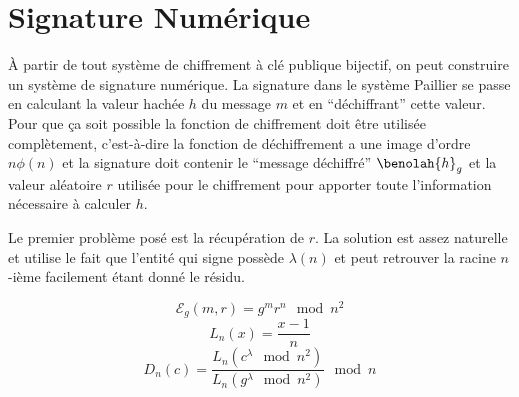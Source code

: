 \chapter{Signature Numérique}

	À partir de tout système de chiffrement à clé publique bijectif, on peut construire un système de signature 
	numérique. %
	La signature dans le sys\-tè\-me Paillier se passe en calculant la valeur hachée $h$ 
	du message $m$ et en ``dé\-chif\-frant'' cette valeur. Pour que ça soit possible 
	la fonction de chiffrement doit être utilisée complètement, c'est-à-dire la fonction de dé\-chif\-fre\-ment
	a une image d'ordre $n\phi(n)$ et la signature doit contenir le ``message déchiffré'' $\benolah{h}_g$ et la valeur 
	aléatoire $r$ utilisée pour le chiffrement pour apporter toute l'information nécessaire à calculer $h$.

	Le premier problème posé est la récupération de $r$. La solution est assez naturelle et utilise le fait que 
	l'entité qui signe possède $\lambda(n)$ et peut retrouver la racine $n$-ième facilement étant donné le résidu.

	\begin{rappel}
		$$\mathcal{E}_g(m,r) = g^mr^n\mod{n^2}$$
		$$L_n(x)  = \frac{x-1}{n}$$
	 	$$D_n(c) = \frac{L_n(c^\lambda\mod{n^2})}{L_n(g^\lambda\mod{n^2})}\mod{n}$$
	\end{rappel}




